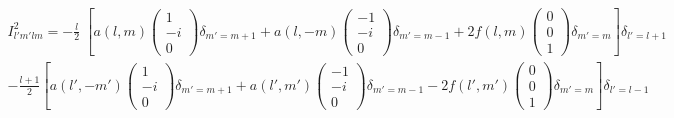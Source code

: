 \documentclass[aps,prb,floatfix,epsfig,singlecolumn,showpacs,preprintnumbers]{revtex4}
\begin{document}
\begin{eqnarray}
I^2_{l'm'lm}=-\frac{l}{2}\;
\left[
a(l,m)
\left(
\begin{array}{c}
1\\
-i\\
0
\end{array}
\right)
\delta_{m'=m+1}
+a(l,-m)
\left(
\begin{array}{c}
-1\\
-i\\
0
\end{array}
\right)
\delta_{m'=m-1}
+2 f(l,m)
\left(
\begin{array}{c}
0\\
0\\
1
\end{array}
\right)
\delta_{m'=m}
\right]\delta_{l'=l+1}
\nonumber\\
-\frac{l+1}{2}
\left[
a(l',-m')
\left(
\begin{array}{c}
1\\
-i\\
0
\end{array}
\right)
\delta_{m'=m+1}
+a(l',m')
\left(
\begin{array}{c}
-1\\
-i\\
0
\end{array}
\right)
\delta_{m'=m-1}
-2 f(l',m')
\left(
\begin{array}{c}
0\\
0\\
1
\end{array}
\right)
\delta_{m'=m}
\right]\delta_{l'=l-1}
\end{eqnarray}
\end{document}
